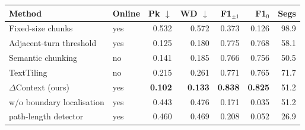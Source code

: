 \begin{tabular}{llrrrrr}
\toprule
Method & Online & Pk $\downarrow$ & WD $\downarrow$ & F1$_{\pm1}$ & F1$_{0}$ & Segs \\
\midrule
Fixed-size chunks & yes & 0.532 & 0.572 & 0.373 & 0.126 & 98.9 \\
Adjacent-turn threshold & yes & 0.125 & 0.180 & 0.775 & 0.768 & 58.1 \\
Semantic chunking & no & 0.141 & 0.185 & 0.766 & 0.756 & 50.5 \\
TextTiling & no & 0.215 & 0.261 & 0.771 & 0.765 & 71.7 \\
$\Delta$Context (ours) & yes & \textbf{0.102} & \textbf{0.133} & \textbf{0.838} & \textbf{0.825} & 51.2 \\
\midrule
\quad w/o boundary localisation & yes & 0.443 & 0.476 & 0.171 & 0.035 & 51.2 \\
\quad path-length detector & yes & 0.460 & 0.469 & 0.208 & 0.052 & 26.9 \\
\bottomrule
\end{tabular}
